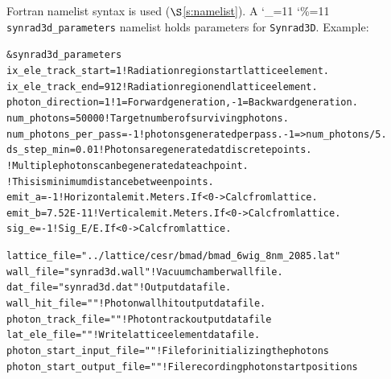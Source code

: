 \documentclass[11pt,openany]{report}
\newcommand{\sref}[1]{$\S$\ref{#1}}
\newcommand{\srthree}{\texttt{Synrad3D}\xspace}
\newcommand\ttcmd{\begingroup\catcode`\_=11 \catcode`\%=11 \dottcmd}
\newcommand\dottcmd[1]{\texttt{#1}\endgroup}
\newcommand{\vn}{\ttcmd}
\newlength{\ExBeg}
\newlength{\ExEnd}
\newenvironment{example}
  {\vspace{\ExBeg} \begin{alltt}}
  {\end{alltt} \vspace{\ExEnd}}
\begin{document}
Fortran namelist syntax is used (\sref{s:namelist}). A \vn{synrad3d_parameters} namelist holds
parameters for \srthree. Example:
\begin{example}
  &synrad3d_parameters
    ix_ele_track_start   = 1      ! Radiation region start lattice element.
    ix_ele_track_end     = 912    ! Radiation region end lattice element.
    photon_direction     = 1      ! 1 = Forward generation, -1 = Backward generation.
    num_photons          = 50000  ! Target number of surviving photons.
    num_photons_per_pass = -1     ! photons generated per pass. -1 => num_photons/5.
    ds_step_min          = 0.01   ! Photons are generated at discrete points. 
                              ! Multiple photons can be generated at each point.
                              ! This is minimum distance between points.
    emit_a       = -1         ! Horizontal emit. Meters. If < 0 -> Calc from lattice.
    emit_b       = 7.52E-11   ! Vertical emit.  Meters. If < 0 -> Calc from lattice.
    sig_e        = -1         ! Sig_E/E. If < 0 -> Calc from lattice.

    lattice_file = "../lattice/cesr/bmad/bmad_6wig_8nm_2085.lat" 
    wall_file    = "synrad3d.wall"   ! Vacuum chamber wall file.
    dat_file     = "synrad3d.dat"    ! Output data file.
    wall_hit_file = ""               ! Photon wall hit output data file.
    photon_track_file = ""           ! Photon track output data file
    lat_ele_file  = ""               ! Write lattice element data file.
    photon_start_input_file  = ""    ! File for initializing the photons
    photon_start_output_file = ""    ! File recording photon start positions


\end{example}
\end{document}
